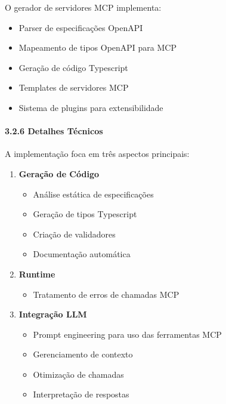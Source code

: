 \documentclass[
]{article}
\providecommand{\tightlist}{%
  \setlength{\itemsep}{0pt}\setlength{\parskip}{0pt}}
\begin{document}
O gerador de servidores MCP implementa:

\begin{itemize}
\tightlist
\item
  Parser de especificações OpenAPI
\item
  Mapeamento de tipos OpenAPI para MCP
\item
  Geração de código Typescript
\item
  Templates de servidores MCP
\item
  Sistema de plugins para extensibilidade
\end{itemize}

\paragraph{3.2.6 Detalhes Técnicos}\label{detalhes-tuxe9cnicos-1}

A implementação foca em três aspectos principais:

\begin{enumerate}
\def\labelenumi{\arabic{enumi}.}
\item
  \textbf{Geração de Código}

  \begin{itemize}
  \tightlist
  \item
    Análise estática de especificações
  \item
    Geração de tipos Typescript
  \item
    Criação de validadores
  \item
    Documentação automática
  \end{itemize}
\item
  \textbf{Runtime}

  \begin{itemize}
  \tightlist
  \item
    Tratamento de erros de chamadas MCP
  \end{itemize}
\item
  \textbf{Integração LLM}

  \begin{itemize}
  \tightlist
  \item
    Prompt engineering para uso das ferramentas MCP
  \item
    Gerenciamento de contexto
  \item
    Otimização de chamadas
  \item
    Interpretação de respostas
  \end{itemize}
\end{enumerate}
\end{document}
